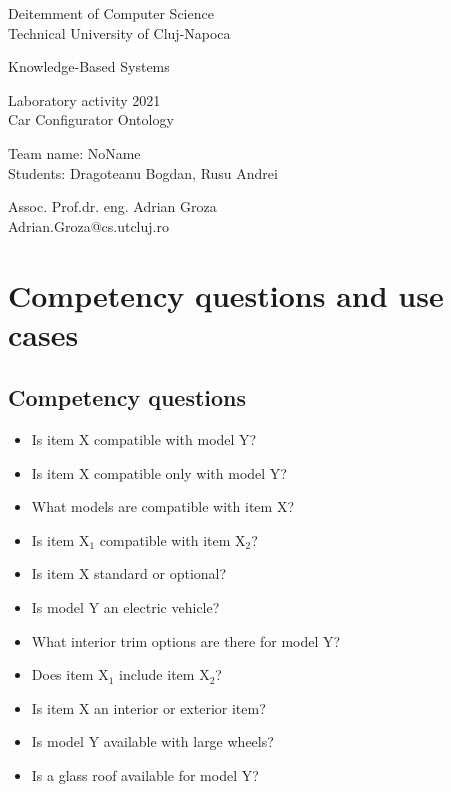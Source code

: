 \documentclass[a4paper,12pt]{report}
\begin{document}
\newcommand{\h}{\texttt}

\vspace{-5cm}
\begin{center}
Deitemment of Computer Science\\
Technical University of Cluj-Napoca\\
\end{center}
\vspace{1cm}
\begin{center}
\begin{Large}
Knowledge-Based Systems\\
\end{Large}

\vspace*{1cm}
Laboratory activity 2021\\

\vspace*{1cm}
Car Configurator Ontology \\
\vspace*{1cm}

Team name: NoName\\
Students: Dragoteanu Bogdan, Rusu Andrei\\

\vspace*{14cm}

Assoc. Prof.dr. eng. Adrian Groza\\
Adrian.Groza@cs.utcluj.ro
\end{center}

\newpage 
\tableofcontents

\chapter{Competency questions and use cases}
\section{Competency questions}

\begin{itemize}
  \item Is item X compatible with model Y?
  \item Is item X compatible only with model Y?
  \item What models are compatible with item X?
  \item Is item X$_1$ compatible with item X$_2$?
  \item Is item X standard or optional?
  \item Is model Y an electric vehicle?
  \item What interior trim options are there for model Y?
  \item Does item X$_1$ include item X$_2$?
  \item Is item X an interior or exterior item?
  \item Is model Y available with large wheels?
  \item Is a glass roof available for model Y?
\end{itemize}
\end{document}
